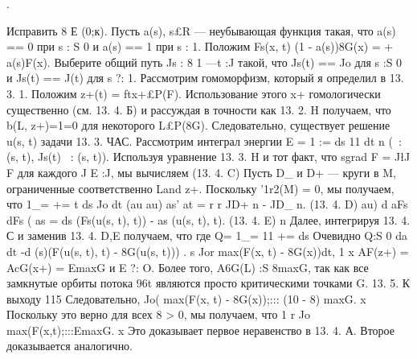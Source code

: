 \noindent{}.

Исправить 8 Е (0;к).
Пусть a(s), s£R — неубывающая функция такая, что a(s) == 0 при s : S 0 и a(s) == 1 при s : 1.
Положим Fs(x, t) (1 - a(s))8G(x) = + a(s)F(x).
Выберите общий путь Js : 8 1 ---t :J такой, что Js(t) == Jo для s :S 0 и Js(t) == J(t) для s ?: 1.
Рассмотрим гомоморфизм, который я определил в 13.
3.
1.
Положим z+(t) = ftx+£P(F).
Использование этого x+ гомологически существенно (см. 13.
4.
Б) и рассуждая в точности как 13.
2.
H получаем, что b(L, z+)=1=0 для некоторого L£P(8G).
Следовательно, существует решение u(s, t) задачи 13.
3.
ЧАС.
Рассмотрим интеграл энергии E = 1 := ds 11 dt n (~: (s, t), Js(t) ~: (s, t)).
Используя уравнение 13.
3.
H и тот факт, что sgrad F = J\l J F для каждого J E :J, мы вычисляем (13.
4.
C) Пусть D_ и D+ — круги в M, ограниченные соответственно Land z+.
Поскольку '1r2(M) = 0, мы получаем, что 1_= += t ds Jo dt (au au) as' at = r r JD+ n - JD_ n.
(13.
4.
D) au) d aFs dFs ( as = ds (Fs(u(s, t), t)) - as (u(s, t), t).
(13.
4.
E) n Далее, интегрируя 13.
4.
С и заменив 13.
4.
D,E получаем, что где Q= 1_= 11 += ds Очевидно Q:S 0 da dt -d (s)(F(u(s, t), t) - 8G(u(s, t))) .
s Jor max(F(x, t) - 8G(x))dt, 1 x AF(z+) = AcG(x+) = EmaxG и E ?: O.
Более того, A6G(L) :S 8maxG, так как все замкнутые орбиты потока {96t} являются просто критическими точками G.
13.
5.
К выходу 115 Следовательно, Jo( max(F(x, t) - 8G(x));::: (10 - 8) maxG.
x Поскольку это верно для всех 8 > 0, мы получаем, что 1 r Jo max(F(x,t);:::EmaxG.
x Это доказывает первое неравенство в 13.
4.
А.
Второе доказывается аналогично.






